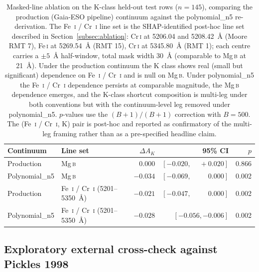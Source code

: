 \documentclass[11pt,a4paper]{article}
\newcommand{\Mgb}{Mg\,\textsc{b}\xspace}
\newcommand{\FeI}{Fe\,\textsc{i}\xspace}
\newcommand{\CrI}{Cr\,\textsc{i}\xspace}
\newcommand{\dA}{\Delta A}
\begin{document}
\begin{table}[ht]
\centering
\caption{Masked-line ablation on the K-class held-out test rows ($n = 145$), comparing the production (Gaia-ESO pipeline) continuum against the polynomial\_n5 re-derivation. The Fe~\textsc{i} / Cr~\textsc{i} line set is the SHAP-identified post-hoc line set described in Section~\ref{subsec:ablation}: \CrI at 5206.04 and 5208.42~\AA{} (Moore RMT 7), \FeI at 5269.54~\AA{} (RMT 15), \CrI at 5345.80~\AA{} (RMT 1); each centre carries a $\pm 5$~\AA{} half-window, total mask width 30~\AA{} (comparable to \Mgb at 21~\AA{}). Under the production continuum the K class shows real (small but significant) dependence on Fe~\textsc{i} / Cr~\textsc{i} and is null on \Mgb. Under polynomial\_n5 the Fe~\textsc{i} / Cr~\textsc{i} dependence persists at comparable magnitude, the \Mgb dependence emerges, and the K-class shortcut composition is multi-leg under both conventions but with the continuum-level leg removed under polynomial\_n5. $p$-values use the \citet{2010SAGMB...9...39P} $(B+1)/(B+1)$ correction with $B = 500$. The (Fe~\textsc{i} / Cr~\textsc{i}, K) pair is post-hoc and reported as confirmatory of the multi-leg framing rather than as a pre-specified headline claim.}
\label{tab:a2_ablation}
\begin{tabular}{llrrr}
\toprule
Continuum & Line set & $\dA_K$ & 95\% CI & $p$ \\
\midrule
Production     & \Mgb                                          & $\phantom{-}0.000$ & $[-0.020, \phantom{-}+0.020]$ & 0.866 \\
Polynomial\_n5 & \Mgb                                          & $-0.034$           & $[-0.069, \phantom{-}\phantom{+}0.000]$ & 0.002 \\
\midrule
Production     & Fe~\textsc{i} / Cr~\textsc{i} (5201--5350~\AA{}) & $-0.021$ & $[-0.047, \phantom{-}\phantom{+}0.000]$ & 0.002 \\
Polynomial\_n5 & Fe~\textsc{i} / Cr~\textsc{i} (5201--5350~\AA{}) & $-0.028$ & $[-0.056, -0.006]$ & 0.002 \\
\bottomrule
\end{tabular}
\end{table}

\subsection{Exploratory external cross-check against Pickles 1998}
\end{document}
